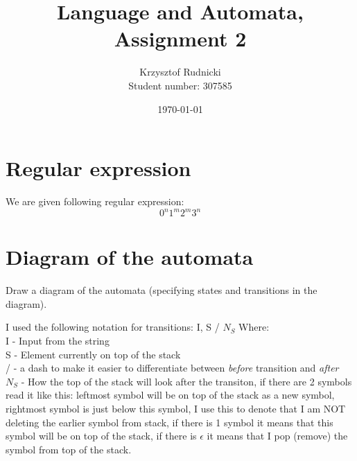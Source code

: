 \documentclass{report}[pt12]
\title{Language and Automata, Assignment 2}
\author{Krzysztof Rudnicki\\ Student number: 307585}
\date{\today}
\begin{document}
\maketitle

\chapter{Regular expression}
We are given following regular expression:
\[ 0^n1^m2^m3^n \]

\chapter{Diagram of the automata}
Draw a diagram of the automata (specifying states and transitions in the diagram).

I used the following notation for transitions:
I, S / $N_S$
Where: \\
I - Input from the string \\
S - Element currently on top of the stack \\
/ - a dash to make it easier to differentiate between \emph{before} transition and \emph{after} \\
$N_S$ - How the top of the stack will look after the transiton, if there are 2 symbols read it like this: leftmost symbol will be on top of the stack as a new symbol, rightmost symbol is just below this symbol, I use this to denote that I am NOT deleting the earlier symbol from stack, if there is 1 symbol it means that this symbol will be on top of the stack, if there is $\epsilon$ it means that I pop (remove) the symbol from top of the stack.
\end{document}
